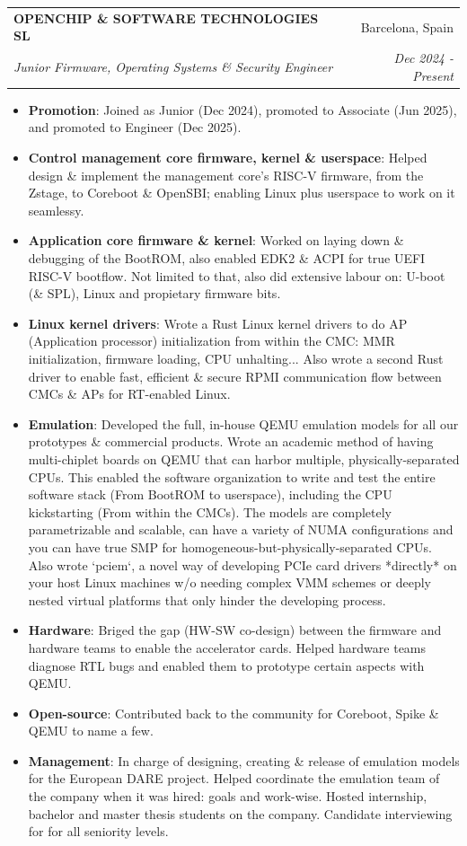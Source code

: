\documentclass[letterpaper,11pt]{article}
\makeatletter
\newcommand{\resumeItem}[2]{
  \item\small{
    \textbf{#1}{: #2 \vspace{-2pt}}
  }
}
\newcommand{\resumeSubheading}[4]{
  \vspace{-1pt}\item
    \begin{tabular*}{0.97\textwidth}{l@{\extracolsep{\fill}}r}
      \textbf{#1} & #2 \\
      \textit{\small#3} & \textit{\small #4} \\
    \end{tabular*}\vspace{-5pt}
}
\newcommand{\resumeItemListStart}{\begin{itemize}}
\newcommand{\resumeItemListEnd}{\end{itemize}\vspace{-5pt}}
\makeatother
\begin{document}
    \resumeSubheading
      {OPENCHIP \& SOFTWARE TECHNOLOGIES SL}{Barcelona, Spain}
      {Junior Firmware, Operating Systems \& Security Engineer}{Dec 2024 - Present}
      \resumeItemListStart
        \resumeItem{Promotion}
              {Joined as Junior (Dec 2024), promoted to Associate (Jun 2025), and promoted to Engineer (Dec 2025).}
        \resumeItem{Control management core firmware, kernel \& userspace}
              {Helped design \& implement the management core's RISC-V firmware, from the Zstage, to Coreboot \& OpenSBI; enabling Linux plus userspace to work on it seamlessy.}
        \resumeItem{Application core firmware \& kernel}
              {Worked on laying down \& debugging of the BootROM, also enabled EDK2 \& ACPI for true UEFI RISC-V bootflow. Not limited to that, also did extensive labour on: U-boot (\& SPL), Linux and propietary firmware bits.}
        \resumeItem{Linux kernel drivers}
          {Wrote a Rust Linux kernel drivers to do AP (Application processor) initialization from within the CMC: MMR initialization, firmware loading, CPU unhalting... Also wrote a second Rust driver to enable fast, efficient \& secure RPMI communication flow between CMCs \& APs for RT-enabled Linux.}
        \resumeItem{Emulation}
          {Developed the full, in-house QEMU emulation models for all our prototypes \& commercial products. Wrote an academic method of having multi-chiplet boards on QEMU that can harbor multiple, physically-separated CPUs. This enabled the software organization to write and test the entire software stack (From BootROM to userspace), including the CPU kickstarting (From within the CMCs). The models are completely parametrizable and scalable, can have a variety of NUMA configurations and you can have true SMP for homogeneous-but-physically-separated CPUs. Also wrote `pciem`, a novel way of developing PCIe card drivers *directly* on your host Linux machines w/o needing complex VMM schemes or deeply nested virtual platforms that only hinder the developing process.}
        \resumeItem{Hardware}
          {Briged the gap (HW-SW co-design) between the firmware and hardware teams to enable the accelerator cards. Helped hardware teams diagnose RTL bugs and enabled them to prototype certain aspects with QEMU.}
        \resumeItem{Open-source}
          {Contributed back to the community for Coreboot, Spike \& QEMU to name a few.}
        \resumeItem{Management}
          {In charge of designing, creating \& release of emulation models for the European DARE project. Helped coordinate the emulation team of the company when it was hired: goals and work-wise. Hosted internship, bachelor and master thesis students on the company. Candidate interviewing for for all seniority levels.}
      \resumeItemListEnd
\end{document}
